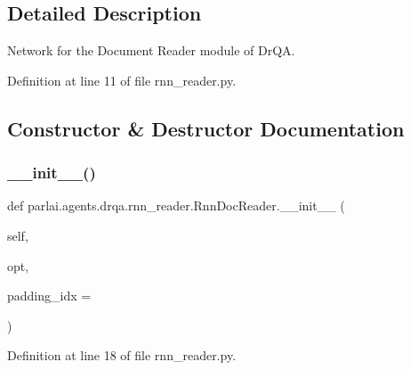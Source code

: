 \subsection{Detailed Description}
\begin{DoxyVerb}Network for the Document Reader module of DrQA.
\end{DoxyVerb}
 

Definition at line 11 of file rnn\+\_\+reader.\+py.



\subsection{Constructor \& Destructor Documentation}
\mbox{\label{classparlai_1_1agents_1_1drqa_1_1rnn__reader_1_1RnnDocReader_aad7ee892d313b0cd61ddeecba9550789}} 
\subsubsection{\texorpdfstring{\+\_\+\+\_\+init\+\_\+\+\_\+()}{\_\_init\_\_()}}
{\footnotesize\ttfamily def parlai.\+agents.\+drqa.\+rnn\+\_\+reader.\+Rnn\+Doc\+Reader.\+\_\+\+\_\+init\+\_\+\+\_\+ (\begin{DoxyParamCaption}\item[{}]{self,  }\item[{}]{opt,  }\item[{}]{padding\+\_\+idx = {} }\end{DoxyParamCaption})}



Definition at line 18 of file rnn\+\_\+reader.\+py.



